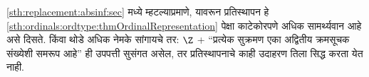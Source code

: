 \ref{sth:replacement:absinf:sec} मध्ये म्हटल्याप्रमाणे, यावरून प्रतिस्थापन हे \ref{sth:ordinals:ordtype:thmOrdinalRepresentation} पेक्षा काटेकोरपणे अधिक सामर्थ्यवान आहे असे दिसते. किंवा थोडे अधिक नेमके सांगायचे तर: $\Z$ + ``प्रत्येक सुक्रमण एका अद्वितीय क्रमसूचक संख्येशी समरूप आहे'' ही उपपत्ती सुसंगत असेल, तर प्रतिस्थापनाचे काही उदाहरण तिला सिद्ध करता येत नाही.














